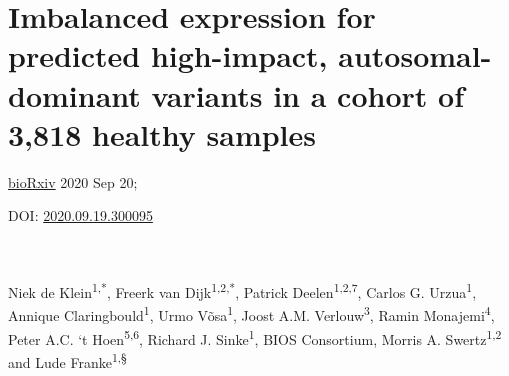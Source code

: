 
\chapterfont{\color{LightOrange}}  %
\sectionfont{\color{LightOrange}}  %
\subsectionfont{\color{LightOrange}}  %

\renewcommand\pcolor{LightOrange}
\renewcommand{\headrule}{\hbox to\headwidth{%
		\color{LightOrange}\leaders\hrule height \headrulewidth\hfill}} %
\fancyfoot[LE,RO]{\thepage}

{ \Large {} }


\chapter[Imbalanced expression for predicted high-impact, autosomal-dominant variants in a cohort of 3,818 healthy samples]{Imbalanced expression for predicted high-impact, autosomal-dominant variants in a cohort of 3,818 healthy samples}
\chaptermark{}

\label{chap:chapter3-ase}


\hfill \underline{bioRxiv} 2020 Sep 20;

\hfill DOI: \href{https://doi.org/10.1101/2020.09.19.300095}{2020.09.19.300095}


\noindent
\\
\\


Niek de Klein\textsuperscript{1,*}, Freerk van Dijk\textsuperscript{1,2,*}, Patrick Deelen\textsuperscript{1,2,7}, Carlos G. Urzua\textsuperscript{1}, Annique Claringbould\textsuperscript{1}, Urmo Võsa\textsuperscript{1}, Joost A.M. Verlouw\textsuperscript{3}, Ramin Monajemi\textsuperscript{4}, Peter A.C. ‘t Hoen\textsuperscript{5,6}, Richard J. Sinke\textsuperscript{1}, BIOS Consortium, Morris A. Swertz\textsuperscript{1,2} and Lude Franke\textsuperscript{1,§}


